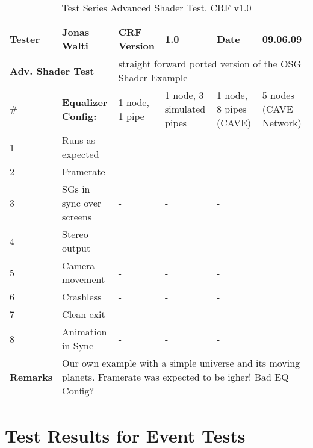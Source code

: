 \begin{table}[H]
	\centering
	\begin{tabular}{|b{}|b{}|m{}|m{}|m{}|m{}|}
		\hline
		\bfseries Tester & Jonas Walti & \bfseries CRF Version & 1.0 & \bfseries Date & 09.06.09 \\
		\hline
		\hline
		\multicolumn{2}{|l|}{\large{\bfseries Adv. Shader Test}} & \multicolumn{4}{p{0.6\textwidth}|}{straight forward ported version of the OSG Shader Example} \\
		\hline
		\hline
		\# & \bfseries Equalizer Config: & 1 node, 1 pipe & 1 node, 3 simulated pipes &  1 node, 8 pipes (CAVE) &  5 nodes (CAVE Network) \\
		\hline 1 & Runs as expected & \quad\quad- & \quad\quad- & \quad\quad- & \tick \\
		\hline 2 & Framerate & \quad\quad- & \quad\quad- & \quad\quad- & \quad\quad300 \\
		\hline 3 & SGs in sync over screens & \quad\quad- & \quad\quad- & \quad\quad- & \tick \\
		\hline 4 & Stereo output & \quad\quad- & \quad\quad- & \quad\quad- & \tick \\
		\hline 5 & Camera movement & \quad\quad- & \quad\quad- & \quad\quad- & \tick \\
		\hline 6 & Crashless & \quad\quad- & \quad\quad- & \quad\quad- & \tick \\
		\hline 7 & Clean exit & \quad\quad- & \quad\quad- & \quad\quad- & \tick \\
		\hline 8 & Animation in Sync & \quad\quad- & \quad\quad- & \quad\quad- & \tick \\
		\hline
		\hline \bfseries Remarks & \multicolumn{5}{p{0.85\textwidth}|}{Our own example with a simple universe and its moving planets. Framerate was expected to be igher! Bad EQ Config?}\\
		\hline
	\end{tabular}
	\caption{Test Series Advanced Shader Test, CRF v1.0}
\end{table}

\section{Test Results for Event Tests}

